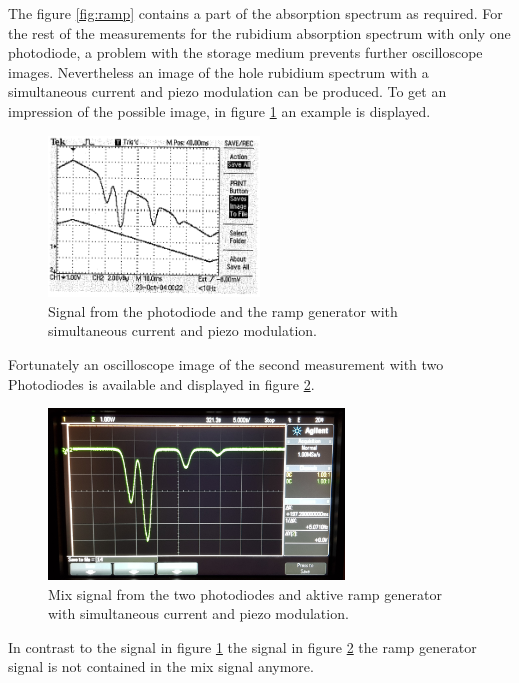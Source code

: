 The figure \ref{fig:ramp} contains a part of the
absorption spectrum as required.
For the rest of the measurements for the rubidium absorption spectrum
with only one photodiode, a problem with the storage medium
prevents further oscilloscope images.
Nevertheless an image of the hole rubidium spectrum
with a simultaneous current and piezo modulation
can be produced. To get an impression of the possible image,
in figure \ref{fig:theory_curve} an example is displayed.

\FloatBarrier
\begin{figure}
  \centering
  \includegraphics[width = 0.5\textwidth]{Rb_modulation.png}
  \caption{Signal from the photodiode and the ramp generator with
  simultaneous current and piezo modulation. \cite{V60}}
  \label{fig:theory_curve}
\end{figure}
\FloatBarrier

Fortunately an oscilloscope image of the second measurement
with two Photodiodes
is available and displayed in figure \ref{fig:2dioden}.

\FloatBarrier
\begin{figure}
  \centering
  \includegraphics[width = 0.7\textwidth]{./figures/Rb_spectrum.jpg}
  \caption{Mix signal from the two photodiodes and aktive ramp generator with
  simultaneous current and piezo modulation.}
  \label{fig:2dioden}
\end{figure}
\FloatBarrier

In contrast to the signal in figure \ref{fig:theory_curve}
the signal in figure \ref{fig:2dioden} the
ramp generator signal is not contained in the mix signal anymore.
